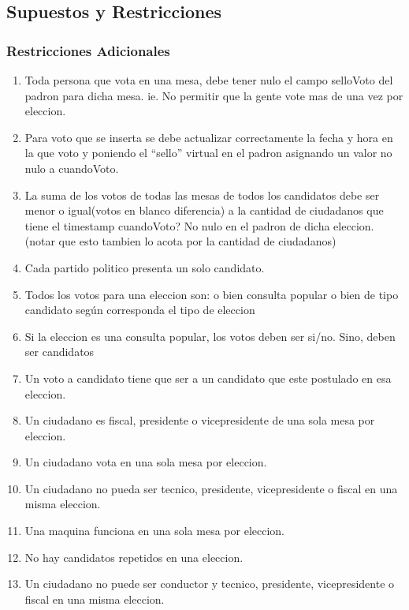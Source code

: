 \subsection{Supuestos y Restricciones}

\subsubsection{Restricciones Adicionales}

\begin{enumerate}
	\item Toda persona que vota en una mesa, debe tener nulo el campo selloVoto del padron para dicha mesa. ie. No permitir que la gente vote mas de una vez por eleccion.
	\item  Para voto que se inserta se debe actualizar correctamente la fecha y hora en la que voto y poniendo el “sello” virtual en el padron asignando un valor no nulo a cuandoVoto.
	\item  La suma de los votos de todas las mesas de todos los candidatos debe ser menor o igual(votos en blanco diferencia) a la cantidad de ciudadanos que tiene el timestamp cuandoVoto? No nulo en el padron de dicha eleccion. (notar que esto tambien lo acota por la cantidad de ciudadanos)
	\item  Cada partido politico presenta un solo candidato.
	\item  Todos los votos para una eleccion son: o bien consulta popular o bien de tipo candidato según corresponda el tipo de eleccion
	\item Si la eleccion es una consulta popular, los votos deben ser si/no. Sino, deben ser candidatos
	\item Un voto a candidato tiene que ser a un candidato que este postulado en esa eleccion.
	\item Un ciudadano es fiscal, presidente o vicepresidente de una sola mesa por eleccion.
	\item Un ciudadano vota en una sola mesa por eleccion.
	\item Un ciudadano no pueda ser tecnico, presidente, vicepresidente o fiscal en una misma eleccion.
	\item Una maquina funciona en una sola mesa por eleccion.
	\item No hay candidatos repetidos en una eleccion.
	\item Un ciudadano no puede ser conductor y tecnico, presidente, vicepresidente o fiscal en una misma eleccion.
\end{enumerate}